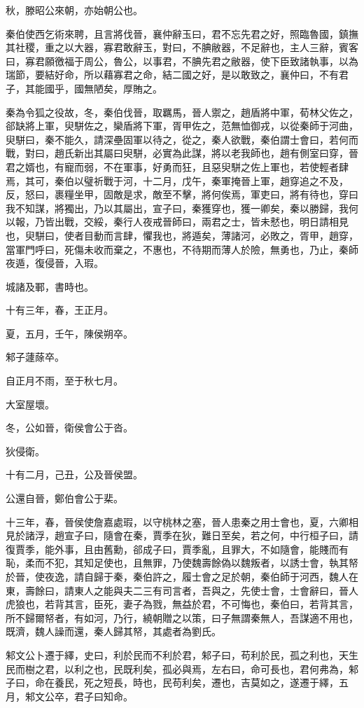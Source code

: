 \begin{pinyinscope}
秋，滕昭公來朝，亦始朝公也。

秦伯使西乞術來聘，且言將伐晉，襄仲辭玉曰，君不忘先君之好，照臨魯國，鎮撫其社稷，重之以大器，寡君敢辭玉，對曰，不腆敝器，不足辭也，主人三辭，賓客曰，寡君願徼福于周公，魯公，以事君，不腆先君之敝器，使下臣致諸執事，以為瑞節，要結好命，所以藉寡君之命，結二國之好，是以敢致之，襄仲曰，不有君子，其能國乎，國無陋矣，厚賄之。

秦為令狐之役故，冬，秦伯伐晉，取羈馬，晉人禦之，趙盾將中軍，荀林父佐之，郤缺將上軍，臾駢佐之，欒盾將下軍，胥甲佐之，范無恤御戎，以從秦師于河曲，臾駢曰，秦不能久，請深壘固軍以待之，從之，秦人欲戰，秦伯謂士會曰，若何而戰，對曰，趙氏新出其屬曰臾駢，必實為此謀，將以老我師也，趙有側室曰穿，晉君之婿也，有寵而弱，不在軍事，好勇而狂，且惡臾駢之佐上軍也，若使輕者肆焉，其可，秦伯以璧祈戰于河，十二月，戊午，秦軍掩晉上軍，趙穿追之不及，反，怒曰，裹糧坐甲，固敵是求，敵至不擊，將何俟焉，軍吏曰，將有待也，穿曰我不知謀，將獨出，乃以其屬出，宣子曰，秦獲穿也，獲一卿矣，秦以勝歸，我何以報，乃皆出戰，交綏，秦行人夜戒晉師曰，兩君之士，皆未憖也，明日請相見也，臾駢曰，使者目動而言肆，懼我也，將遁矣，薄諸河，必敗之，胥甲，趙穿，當軍門呼曰，死傷未收而棄之，不惠也，不待期而薄人於險，無勇也，乃止，秦師夜遁，復侵晉，入瑕。

城諸及鄆，書時也。

十有三年，春，王正月。

夏，五月，壬午，陳侯朔卒。

邾子蘧蒢卒。

自正月不雨，至于秋七月。

大室屋壞。

冬，公如晉，衛侯會公于沓。

狄侵衛。

十有二月，己丑，公及晉侯盟。

公還自晉，鄭伯會公于棐。

十三年，春，晉侯使詹嘉處瑕，以守桃林之塞，晉人患秦之用士會也，夏，六卿相見於諸浮，趙宣子曰，隨會在秦，賈季在狄，難日至矣，若之何，中行桓子曰，請復賈季，能外事，且由舊勳，郤成子曰，賈季亂，且罪大，不如隨會，能賤而有恥，柔而不犯，其知足使也，且無罪，乃使魏壽餘偽以魏叛者，以誘士會，執其帑於晉，使夜逸，請自歸于秦，秦伯許之，履士會之足於朝，秦伯師于河西，魏人在東，壽餘曰，請東人之能與夫二三有司言者，吾與之，先使士會，士會辭曰，晉人虎狼也，若背其言，臣死，妻子為戮，無益於君，不可悔也，秦伯曰，若背其言，所不歸爾帑者，有如河，乃行，繞朝贈之以策，曰子無謂秦無人，吾謀適不用也，既濟，魏人譟而還，秦人歸其帑，其處者為劉氏。

邾文公卜遷于繹，史曰，利於民而不利於君，邾子曰，苟利於民，孤之利也，天生民而樹之君，以利之也，民既利矣，孤必與焉，左右曰，命可長也，君何弗為，邾子曰，命在養民，死之短長，時也，民苟利矣，遷也，吉莫如之，遂遷于繹，五月，邾文公卒，君子曰知命。


\end{pinyinscope}
